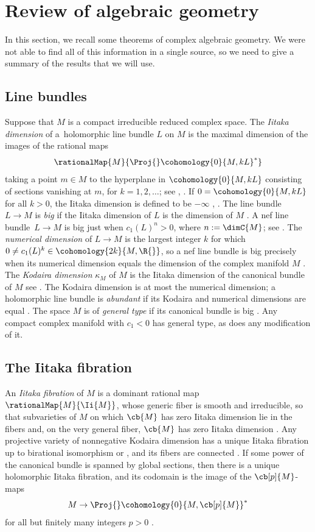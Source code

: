 \section{Review of algebraic geometry}\label{section:algebraic.geometry}
In this section, we recall some theorems of complex algebraic geometry.
We were not able to find all of this information in a single source, so we need to give a summary of the results that we will use.
\subsection{Line bundles}
Suppose that $M$ is a compact irreducible reduced complex space.
The \emph{Iitaka dimension} of a~holomorphic line bundle $L$ on $M$ is the maximal dimension of the images of the rational maps
\[
\rationalMap{M }{ \Proj{}\cohomology{0}{M, kL}^*}
\]
taking a point $m \in M$ to the hyperplane in $\cohomology{0}{M, kL}$ consisting of sections vanishing at $m$, for $k = 1,
2, \dots$; see \cite[p.~50]{Ueno:1975}, \cite[Definition~2.1.3]{Lazarsfeld:2004}.
If $0 = \cohomology{0}{M, kL}$ for all $k > 0$, the Iitaka dimension is defined to be $-\infty$ \cite[p.~50]{Ueno:1975}, \cite[Definition~2.1.3]{Lazarsfeld:2004}.
The line bundle $L \to M$ is \emph{big} if the Iitaka dimension of $L$ is the dimension of $M$ \cite[Definition~2.2.1]{Lazarsfeld:2004}.
A nef line bundle~${L \to M}$ is big just when $c_1(L)^n > 0$, where $n := \dimC{M}$; see \cite[Theorem~2.2.16]{Lazarsfeld:2004}.
The \emph{numerical dimension} of $L \to M$ is the largest integer $k$ for which
$0 \ne c_1(L)^k \in \cohomology{2k}{M, \R{}}$, so a nef line bundle is big precisely when its numerical dimension equals the dimension of the complex manifold $M$ \cite[Remark~2.3.17]{Lazarsfeld:2004}.
The \emph{Kodaira dimension} $\kappa_M$ of $M$ is the Iitaka dimension of the canonical bundle of $M$ see \cite[p.~65]{Ueno:1975}.
The Kodaira dimension is at most the numerical dimension; a holomorphic line bundle is \emph{abundant} if its Kodaira and numerical dimensions are equal \cite[Remark~2.3.17]{Lazarsfeld:2004}.
The space $M$ is of \emph{general type} if its canonical bundle is big \cite[Example 2.2.2]{Lazarsfeld:2004}.
Any compact complex manifold with $c_1 < 0$ has general type, as does any modification of it.
\subsection{The Iitaka fibration}
An \emph{Iitaka fibration} of $M$ is a dominant rational map $\rationalMap{M}{\Ii{M}}$, whose generic fiber is smooth and irreducible, so that subvarieties of $M$ on which $\cb{M}$ has zero Iitaka dimension lie in the fibers and, on the very general fiber, $\cb{M}$ has zero Iitaka dimension \cite[Theorem~2.1.33]{Lazarsfeld:2004}.
Any projective variety of nonnegative Kodaira dimension has a unique Iitaka fibration up to birational isomorphism
\cite[Theorem~10.3]{Iitaka:1982} or \cite[Theorem~5.10]{Ueno:1975},
and its fibers are connected \cite[p.~124]{Lazarsfeld:2004}.
If some power of the canonical bundle is spanned by global sections, then there is a unique holomorphic Iitaka fibration, and its codomain is the image of the $\cb[p]{M}$-maps
\[
M \to \Proj{}\cohomology{0}{M,\cb[p]{M}}^*
\]
for all but finitely many integers $p > 0$ \cite[p.~133]{Lazarsfeld:2004}.

